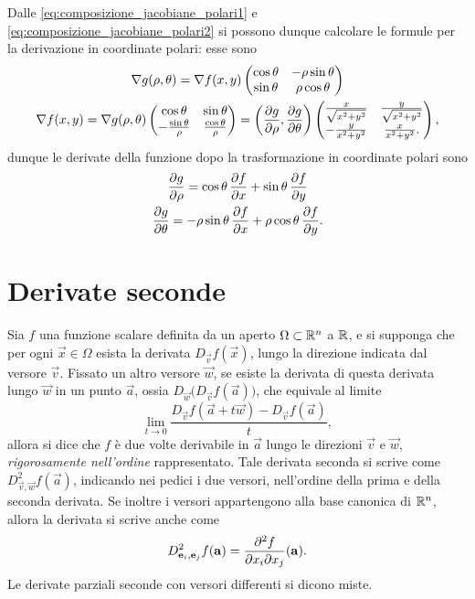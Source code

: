 Dalle \eqref{eq:composizione_jacobiane_polari1} e \eqref{eq:composizione_jacobiane_polari2} si possono dunque calcolare le formule per la derivazione in coordinate polari: esse sono
\begin{equation} \label{eq:jacobiane_polari}
\begin{gathered}
\nabla g(\rho,\theta)
=\nabla f(x,y)
	\begin{pmatrix}
	\cos\theta	&-\rho\sin\theta\\
	\sin\theta	&\rho\cos\theta
	\end{pmatrix}\\
\nabla f(x,y)
=\nabla g(\rho,\theta)
	\begin{pmatrix}
	\cos\theta			&\sin\theta\\
	-\frac{\sin\theta}{\rho}	&\frac{\cos\theta}{\rho}
	\end{pmatrix}
=\bigg(\frac{\partial {g}}{\partial {\rho}},\frac{\partial {g}}{\partial {\theta}}\bigg)
	\begin{pmatrix}
	\frac{x}{\sqrt{x^2+y^2}}	&\frac{y}{\sqrt{x^2+y^2}}\\
	-\frac{y}{x^2+y^2}		&\frac{x}{x^2+y^2}.
	\end{pmatrix},
\end{gathered}
\end{equation}
dunque le derivate della funzione dopo la trasformazione in coordinate polari sono
\begin{equation} \label{eq:derivate_polari}
\begin{gathered}
\frac{\partial {g}}{\partial {\rho}}=\cos\theta\,\frac{\partial {f}}{\partial {x}}+\sin\theta\,\frac{\partial {f}}{\partial {y}}\\
\frac{\partial {g}}{\partial {\theta}}=-\rho\sin\theta\,\frac{\partial {f}}{\partial {x}}+\rho\cos\theta\,\frac{\partial {f}}{\partial {y}}.
\end{gathered}
\end{equation}

\section{Derivate seconde}
Sia $f$ una funzione scalare definita da un aperto $\Omega\subset\mathbb{R}^n$ a $\mathbb{R}$, e si supponga che per ogni $\vec x\in\Omega$ esista la derivata $D_{\vec v}f(\vec x)$, lungo la direzione indicata dal versore $\vec v$. Fissato un altro versore $\vec w$, se esiste la derivata di questa derivata lungo $\vec w$ in un punto $\vec a$, ossia $D_{\vec w}\big(D_{\vec v}f(\vec a)\big)$, che equivale al limite
\[
\lim_{t\to 0}\frac{D_{\vec v}f(\vec a+t\vec w)-D_{\vec v}f(\vec a)}{t},
\]
allora si dice che $f$ è due volte derivabile in $\vec a$ lungo le direzioni $\vec v$ e $\vec w$, \emph{rigorosamente nell'ordine} rappresentato. Tale derivata seconda si scrive come $D^2_{\vec v,\vec w}f(\vec a)$, indicando nei pedici i due versori, nell'ordine della prima e della seconda derivata.
Se inoltre i versori appartengono alla base canonica di $\mathbb{R}^n$, allora la derivata si scrive anche come
\[
D^2_{\mathbf{e}_i,\mathbf{e}_j}f(\mathbf{a})=\frac{\partial^2f}{\partial x_i\partial x_j}(\mathbf{a}).
\]
Le derivate parziali seconde con versori differenti si dicono miste.

